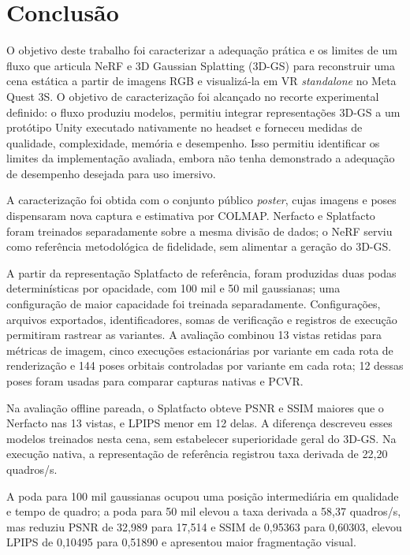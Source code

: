 \chapter{Conclusão}

O objetivo deste trabalho foi caracterizar a adequação prática e os limites de um fluxo que articula NeRF e 3D Gaussian Splatting (3D-GS) para reconstruir uma cena estática a partir de imagens RGB e visualizá-la em VR \textit{standalone} no Meta Quest 3S. O objetivo de caracterização foi alcançado no recorte experimental definido: o fluxo produziu modelos, permitiu integrar representações 3D-GS a um protótipo Unity executado nativamente no headset e forneceu medidas de qualidade, complexidade, memória e desempenho. Isso permitiu identificar os limites da implementação avaliada, embora não tenha demonstrado a adequação de desempenho desejada para uso imersivo.

A caracterização foi obtida com o conjunto público \textit{poster}, cujas imagens e poses dispensaram nova captura e estimativa por COLMAP. Nerfacto e Splatfacto foram treinados separadamente sobre a mesma divisão de dados; o NeRF serviu como referência metodológica de fidelidade, sem alimentar a geração do 3D-GS.

A partir da representação Splatfacto de referência, foram produzidas duas podas determinísticas por opacidade, com 100 mil e 50 mil gaussianas; uma configuração de maior capacidade foi treinada separadamente. Configurações, arquivos exportados, identificadores, somas de verificação e registros de execução permitiram rastrear as variantes. A avaliação combinou 13 vistas retidas para métricas de imagem, cinco execuções estacionárias por variante em cada rota de renderização e 144 poses orbitais controladas por variante em cada rota; 12 dessas poses foram usadas para comparar capturas nativas e PCVR.

Na avaliação offline pareada, o Splatfacto obteve PSNR e SSIM maiores que o Nerfacto nas 13 vistas, e LPIPS menor em 12 delas. A diferença descreveu esses modelos treinados nesta cena, sem estabelecer superioridade geral do 3D-GS. Na execução nativa, a representação de referência registrou taxa derivada de 22,20 quadros/s. 

A poda para 100 mil gaussianas ocupou uma posição intermediária em qualidade e tempo de quadro; a poda para 50 mil elevou a taxa derivada a 58,37 quadros/s, mas reduziu PSNR de 32,989 para 17,514 e SSIM de 0,95363 para 0,60303, elevou LPIPS de 0,10495 para 0,51890 e apresentou maior fragmentação visual. 

